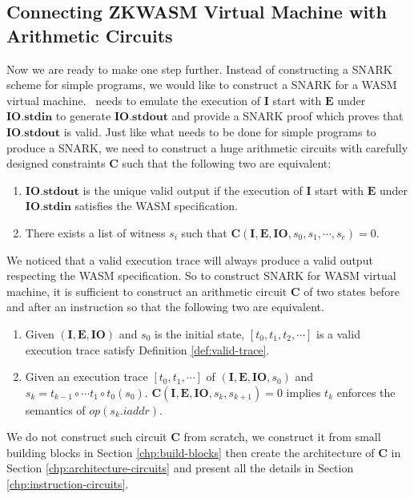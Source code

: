 \subsection{Connecting ZKWASM Virtual Machine with Arithmetic Circuits}
\label{chp:encode-state-in-circuits}
Now we are ready to make one step further. Instead of constructing a SNARK scheme for simple programs, we would like to construct a SNARK for a WASM virtual machine. \zkwasm\,  needs to emulate the execution of $\mathbf{I}$ start with $\mathbf{E}$ under $\mathbf{IO.\mathbf{stdin}}$ to generate $\mathbf{IO.\mathbf{stdout}}$ and provide a SNARK proof which proves that $\mathbf{IO.\mathbf{stdout}}$ is valid. Just like what needs to be done for simple programs to produce a SNARK, we need to construct a huge arithmetic circuits with carefully designed constraints $\mathbf{C}$ such that the following two are equivalent:
\begin{enumerate}[leftmargin=*]
\item $\mathbf{IO.\mathbf{stdout}}$ is the unique valid output if the execution of $\mathbf{I}$ start with $\mathbf{E}$ under $\mathbf{IO.\mathbf{stdin}}$ satisfies the WASM specification.

\item There exists a list of witness $s_i$ such that $\mathbf{C}(\mathbf{I}, \mathbf{E}, \mathbf{IO}, s_0, s_1,\cdots, s_e) = 0$.
\end{enumerate}

We noticed that a valid execution trace will always produce a valid output respecting the WASM specification. So to construct SNARK for WASM virtual machine, it is sufficient to construct an arithmetic circuit $\mathbf{C}$ of two states before and after an instruction so that the following two are equivalent.
\begin{enumerate}[leftmargin=*]
\item Given $(\mathbf{I}, \mathbf{E}, \mathbf{IO})$ and $s_0$ is the initial state, $\left[t_0, t_1, t_2, \cdots \right]$ is a valid execution trace satisfy Definition \ref{def:valid-trace}.
\item Given an execution trace $\left[t_0, t_1, \cdots \right]$ of $(\mathbf{I}, \mathbf{E}, \mathbf{IO}, s_0)$ and $s_k = t_{k-1} \circ \cdots t_1 \circ t_0 (s_0)$. $\mathbf{C}(\mathbf{I}, \mathbf{E}, \mathbf{IO}, s_k, s_{k+1}) = 0$ implies $t_k$ enforces the semantics of $op(s_k.iaddr)$.
\end{enumerate}

We do not construct such circuit $\mathbf{C}$ from scratch, we construct it from small building blocks in Section \ref{chp:build-blocks} then create the architecture of $\mathbf{C}$ in Section \ref{chp:architecture-circuits} and present all the details in Section \ref{chp:instruction-circuits}.
 
